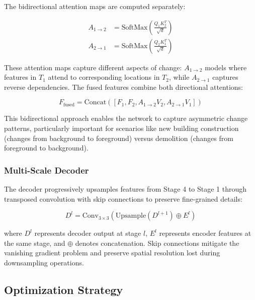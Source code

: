 \documentclass[journal]{IEEEtran}
\begin{document}
The bidirectional attention maps are computed separately:

\begin{equation}
\begin{aligned}
A_{1 \rightarrow 2} &= \text{SoftMax}\left(\frac{Q_1 K_2^T}{\sqrt{d}}\right) \\
A_{2 \rightarrow 1} &= \text{SoftMax}\left(\frac{Q_2 K_1^T}{\sqrt{d}}\right)
\end{aligned}
\label{eq:btf}
\end{equation}

These attention maps capture different aspects of change: $A_{1 \rightarrow 2}$ models where features in $T_1$ attend to corresponding locations in $T_2$, while $A_{2 \rightarrow 1}$ captures reverse dependencies. The fused features combine both directional attentions:

\begin{equation}
F_{\text{fused}} = \text{Concat}([F_1, F_2, A_{1 \rightarrow 2} V_2, A_{2 \rightarrow 1} V_1])
\label{eq:fusion}
\end{equation}

This bidirectional approach enables the network to capture asymmetric change patterns, particularly important for scenarios like new building construction (changes from background to foreground) versus demolition (changes from foreground to background).

\subsubsection{Multi-Scale Decoder}

The decoder progressively upsamples features from Stage 4 to Stage 1 through transposed convolution with skip connections to preserve fine-grained details:

\begin{equation}
D^l = \text{Conv}_{3\times 3}(\text{Upsample}(D^{l+1}) \oplus E^l)
\label{eq:decoder}
\end{equation}

where $D^l$ represents decoder output at stage $l$, $E^l$ represents encoder features at the same stage, and $\oplus$ denotes concatenation. Skip connections mitigate the vanishing gradient problem and preserve spatial resolution lost during downsampling operations.

\subsection{Optimization Strategy}
\end{document}
